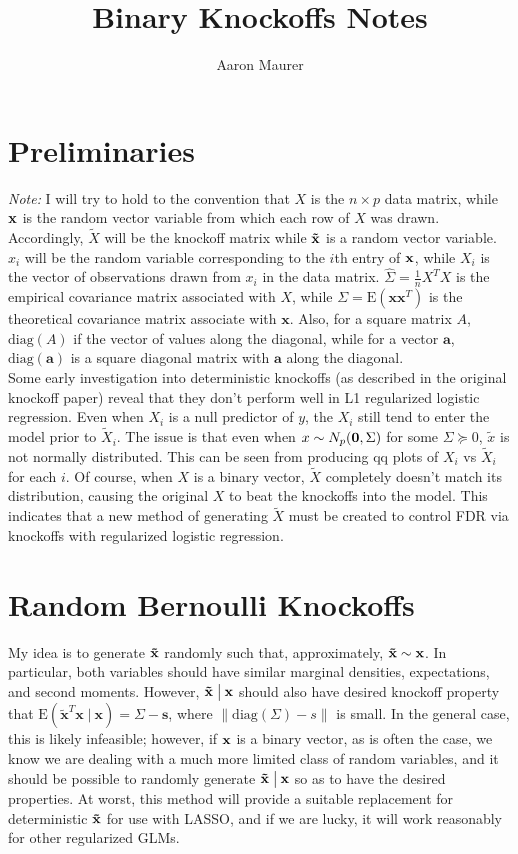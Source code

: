 \documentclass[11pt]{article}
\newcommand{\E}{\mathrm{E}}
\newcommand{\diag}{\mathrm{diag}}
\newcommand{\st}{ \; \big | \:}
\theoremstyle{definition}
\begin{document}
\title{Binary Knockoffs Notes}
\author{Aaron Maurer}
\maketitle
\section{Preliminaries} 
    {\em Note:} I will try to hold to the convention that $X$ is the $n\times p$ data matrix, while $\bf x$ is the random vector variable from which each row of $X$ was drawn. Accordingly, $\tilde X$ will be the knockoff matrix while $\bf \tilde x$ is a random vector variable. $x_i$ will be the random variable corresponding to the $i$th entry of $\bf x$, while $X_i$ is the vector of observations drawn from $x_i$ in the data matrix. $\hat \Sigma = \frac{1}{n}X^TX$ is the empirical covariance matrix associated with $X$, while $\Sigma=\E(\mathbf x \mathbf x^T)$ is the theoretical covariance matrix associate with $\mathbf x$. Also, for a square matrix $A$, $\diag(A)$ if the vector of values along the diagonal, while for a vector $\mathbf a$, $\diag(\mathbf a)$ is a square diagonal matrix with $\mathbf a$ along the diagonal.\\

    Some early investigation into deterministic knockoffs (as described in the original knockoff paper) reveal that they don't perform well in L1 regularized logistic regression. Even when $X_i$ is a null predictor of $y$, the $X_i$ still tend to enter the model prior to $\tilde X_i$. The issue is that even when $x\sim N_p({\bf 0}, \Sigma)$ for some $\Sigma\succeq 0$, $\tilde x$ is not normally distributed. This can be seen from producing qq plots of $X_i$ vs $\tilde X_i$ for each $i$. Of course, when $X$ is a binary vector, $\tilde X$ completely doesn't match its distribution, causing the original $X$ to beat the knockoffs into the model. This indicates that a new method of generating $\tilde X$ must be created to control FDR via knockoffs with regularized logistic regression. 

\section{Random Bernoulli Knockoffs}
    My idea is to generate $\bf \tilde x$ randomly such that, approximately, $\bf \tilde x\sim \bf x$. In particular, both variables should have similar marginal densities, expectations, and second moments. However, $\bf \tilde x\st \bf x$ should also have desired knockoff property that $\E(\mathbf{\tilde x}^T\mathbf x\st \mathbf x) = \Sigma-\mathbf s$, where $\|\diag(\Sigma)-s\|$ is small. In the general case, this is likely infeasible; however, if $\bf x$ is a binary vector, as is often the case, we know we are dealing with a much more limited class of random variables, and it should be possible to randomly generate $\bf \tilde x\st \bf x$ so as to have the desired properties. At worst, this method will provide a suitable replacement for deterministic $\bf \tilde x$ for use with LASSO, and if we are lucky, it will work reasonably for other regularized GLMs. 
\end{document}
